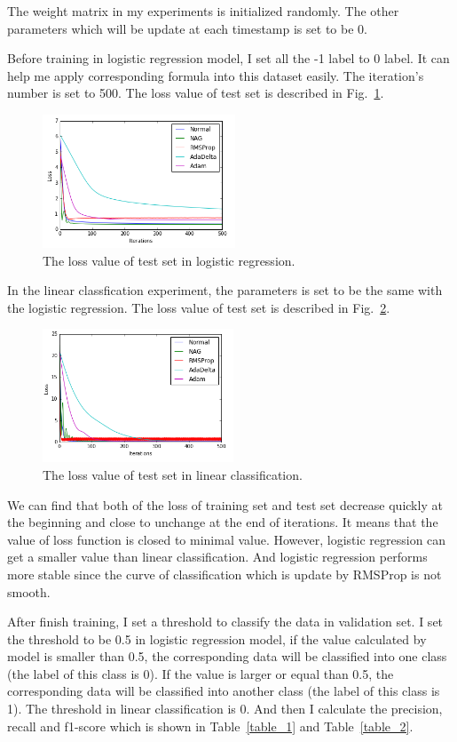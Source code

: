\documentclass[journal, a4paper]{IEEEtran}
\begin{document}
The weight matrix in my experiments is initialized randomly. The other parameters which will be update at each timestamp is set to be 0.

Before training in logistic regression model, I set all the -1 label to 0 label. It can help me apply corresponding formula into this dataset easily. The iteration's number is set to 500. The loss value of test set is described in Fig.~\ref{fig_1}.
\begin{figure}[htbp]
\centerline{\includegraphics[height=150px]{line_1.png}}
\caption{The loss value of test set in logistic regression.}
\label{fig_1}
\end{figure}

In the linear classfication experiment, the parameters is set to be the same with the logistic regression. The loss value of test set is described in Fig.~\ref{fig_2}.

\begin{figure}[htbp]
\centerline{\includegraphics[height=150px]{line_2.png}}
\caption{The loss value of test set in linear classification.}
\label{fig_2}
\end{figure}

We can find that both of the loss of training set and test set decrease quickly at the beginning and close to unchange at the end of iterations. It means that the value of loss function is closed to minimal value. However, logistic regression can get a smaller value than linear classification. And logistic regression performs more stable since the curve of classification which is update by RMSProp is not smooth.

After finish training, I set a threshold to classify the data in validation set. I set the threshold to be 0.5 in logistic regression model, if the value calculated by model is smaller than 0.5, the corresponding data will be classified into one class (the label of this class is 0). If the value is larger or equal than 0.5, the corresponding data will be classified into another class (the label of this class is 1). The threshold in linear classification is 0. And then I calculate the precision, recall and f1-score which is shown in Table~\ref{table_1} and Table~\ref{table_2}.
\end{document}
